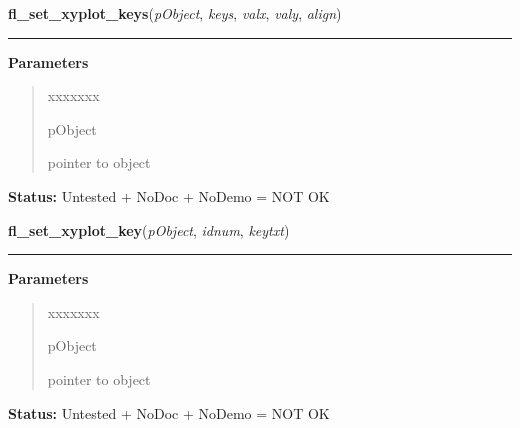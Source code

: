 \hspace{.8\funcindent}\begin{boxedminipage}{\funcwidth}

    \raggedright \textbf{fl\_set\_xyplot\_keys}(\textit{pObject}, \textit{keys}, \textit{valx}, \textit{valy}, \textit{align})

    \vspace{-1.5ex}

    \rule{\textwidth}{0.5\fboxrule}
\setlength{\parskip}{2ex}
\setlength{\parskip}{1ex}
      \textbf{Parameters}
      \vspace{-1ex}

      \begin{quote}
        \begin{Ventry}{xxxxxxx}

          \item[pObject]

          pointer to object

        \end{Ventry}

      \end{quote}

\textbf{Status:} Untested + NoDoc + NoDemo = NOT OK



    \end{boxedminipage}

    \label{xformslib:library:fl_set_xyplot_key}

    \vspace{0.5ex}

\hspace{.8\funcindent}\begin{boxedminipage}{\funcwidth}

    \raggedright \textbf{fl\_set\_xyplot\_key}(\textit{pObject}, \textit{idnum}, \textit{keytxt})

    \vspace{-1.5ex}

    \rule{\textwidth}{0.5\fboxrule}
\setlength{\parskip}{2ex}
\setlength{\parskip}{1ex}
      \textbf{Parameters}
      \vspace{-1ex}

      \begin{quote}
        \begin{Ventry}{xxxxxxx}

          \item[pObject]

          pointer to object

        \end{Ventry}

      \end{quote}

\textbf{Status:} Untested + NoDoc + NoDemo = NOT OK



    \end{boxedminipage}

